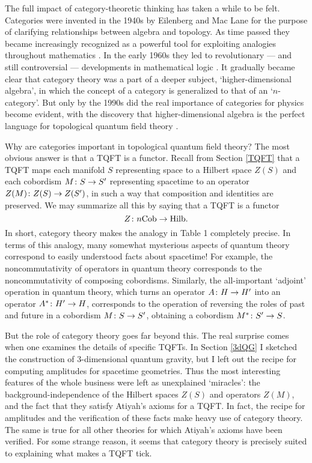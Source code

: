 \documentclass[12pt,amsfonts]{article}
\begin{document}
The full impact of category-theoretic thinking has taken a while to be
felt.  Categories were invented in the 1940s by Eilenberg and Mac Lane
for the purpose of clarifying relationships between algebra and
topology.  As time passed they became increasingly recognized as a
powerful tool for exploiting analogies throughout mathematics
\cite{MacLane}.   In the early 1960s they led to revolutionary --- and
still controversial --- developments in mathematical logic
\cite{Goldblatt}.  It gradually became clear that category theory
was a part of a deeper subject, `higher-dimensional algebra', in which
the concept of a category is generalized to that of an `$n$-category'.
But only by the 1990s did the real importance of categories for physics
become evident, with the discovery that higher-dimensional algebra is
the perfect language for topological quantum field theory \cite{Crane,L}.

Why are categories important in topological quantum field theory? 
The most obvious answer is that a TQFT is a functor.  Recall from Section
\ref{TQFT} that a TQFT maps each manifold $S$ representing space to a
Hilbert space $Z(S)$ and each cobordism $M \colon S \rightarrow S'$ representing
spacetime to an operator $Z(M) \colon Z(S) \rightarrow Z(S')$, in such a
way that composition and identities are preserved.  We may summarize all
this by saying that a TQFT is a functor 
\[   Z \colon   n{\rm Cob} \rightarrow {\rm Hilb}.  \]
In short, category theory makes the analogy in Table 1 completely
precise.  In terms of this analogy, many somewhat mysterious aspects of
quantum theory correspond to easily understood facts about spacetime!
For example, the noncommutativity of operators in quantum
theory corresponds to the noncommutativity of composing cobordisms. 
Similarly, the all-important `adjoint' operation in quantum theory,
which turns an operator $A \colon  H \rightarrow H'$ into an operator $A^* \colon
H' \rightarrow H$, corresponds to the operation of reversing the roles of past
and future in a cobordism $M \colon S \rightarrow S'$, obtaining a cobordism $M^*
\colon S' \rightarrow S$.  

But the role of category theory goes far beyond this.  The real surprise
comes when one examines the details of specific TQFTs.  In Section
\ref{3dQG} I sketched the construction of 3-dimensional quantum gravity,
but I left out the recipe for computing amplitudes for spacetime
geometries.   Thus the most interesting features of the whole business
were left as unexplained `miracles': the background-independence of the
Hilbert spaces $Z(S)$ and operators $Z(M)$, and the fact that they
satisfy Atiyah's axioms for a TQFT.   In fact, the recipe for amplitudes
and the verification of these facts make heavy use of category theory. 
The same is true for all other theories for which Atiyah's axioms have
been verified.  For some strange reason, it seems that category theory is
precisely suited to explaining what makes a TQFT tick.
\end{document}

